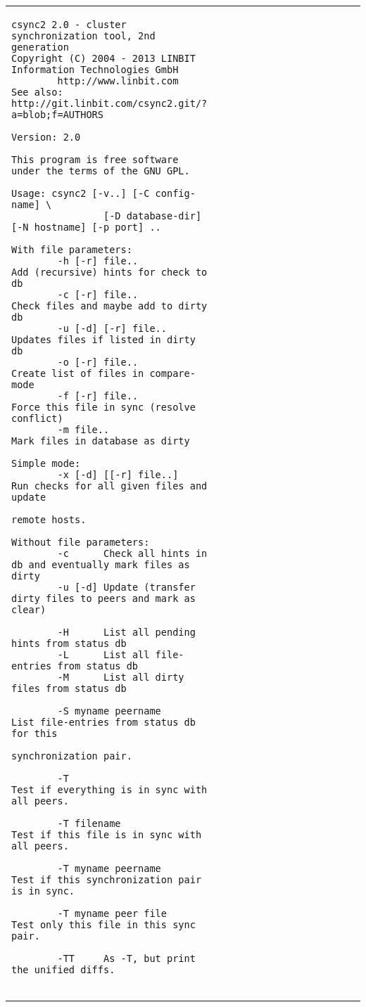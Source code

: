 \documentclass[a4paper,twocolumn]{article}
\begin{document}
\begin{figure*}[t]
  \begin{center}
    \begin{tabular}{|p{0.5\linewidth}|p{0.5\linewidth}|}
      \hline
\begin{tiny}
\begin{verbatim}
csync2 2.0 - cluster synchronization tool, 2nd generation
Copyright (C) 2004 - 2013 LINBIT Information Technologies GmbH
        http://www.linbit.com
See also: http://git.linbit.com/csync2.git/?a=blob;f=AUTHORS

Version: 2.0

This program is free software under the terms of the GNU GPL.

Usage: csync2 [-v..] [-C config-name] \
                [-D database-dir] [-N hostname] [-p port] ..

With file parameters:
        -h [-r] file..          Add (recursive) hints for check to db
        -c [-r] file..          Check files and maybe add to dirty db
        -u [-d] [-r] file..     Updates files if listed in dirty db
        -o [-r] file..          Create list of files in compare-mode
        -f [-r] file..          Force this file in sync (resolve conflict)
        -m file..               Mark files in database as dirty

Simple mode:
        -x [-d] [[-r] file..]   Run checks for all given files and update
                                remote hosts.

Without file parameters:
        -c      Check all hints in db and eventually mark files as dirty
        -u [-d] Update (transfer dirty files to peers and mark as clear)

        -H      List all pending hints from status db
        -L      List all file-entries from status db
        -M      List all dirty files from status db

        -S myname peername      List file-entries from status db for this
                                synchronization pair.

        -T                      Test if everything is in sync with all peers.

        -T filename             Test if this file is in sync with all peers.

        -T myname peername      Test if this synchronization pair is in sync.

        -T myname peer file     Test only this file in this sync pair.

        -TT     As -T, but print the unified diffs.


\end{verbatim}
\end{tiny}
\end{tabular}
\end{center}
\end{figure*}
\end{document}
